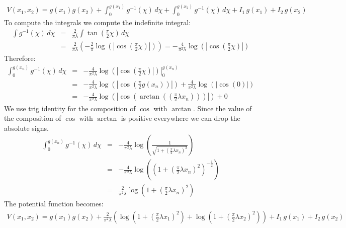 \begin{eqnarray*}
V(x_1, x_2) = g(x_1) g(x_2) + \int_0^{g(x_1)} g^{-1}(\chi) \, d\chi 
                            + \int_0^{g(x_2)} g^{-1}(\chi) \, d\chi
             + I_1 \, g(x_1) + I_2 \, g(x_2) 
\end{eqnarray*}
To compute the integrals we compute the indefinite integral:
\begin{eqnarray*}
\int g^{-1}(\chi) \, d\chi  &=& \frac{2}{\pi\lambda} 
                        \int \tan\left( \frac{\pi}{2} \chi \right) \, d\chi \\
~ &=& \frac{2}{\pi\lambda} 
\left( -\frac{2}{\pi} \log\left( \left|\cos\left(\frac{\pi}{2}\chi \right)\right|\right)\right)
= -\frac{4}{\pi^2\lambda} 
\log\left( \left|\cos\left(\frac{\pi}{2}\chi \right)\right|\right)
\end{eqnarray*}
Therefore:
\begin{eqnarray*}
\int_0^{g(x_n)} g^{-1}(\chi) \, d\chi  &=& 
 -\frac{4}{\pi^2\lambda} \left.  \log\left( \left|\cos\left(\frac{\pi}{2}\chi 
\right)\right|\right)\right|_0^{g(x_n)} \\
~ &=& 
 -\frac{4}{\pi^2\lambda}  \log\left( \left|\cos\left(\frac{\pi}{2} g(x_n)
\right)\right|\right)
 +\frac{4}{\pi^2\lambda}  \log\left( \left|\cos(0) \right|\right) \\
~ &=& 
 -\frac{4}{\pi^2\lambda}  \log\left( \left|\cos\left(\arctan\left(
                        \left( \frac{\pi}{2} \lambda x_n \right)\right)\right)\right|\right) + 0
\end{eqnarray*}
We use trig identity for the composition of $\cos$ with $\arctan$.
Since the value of the composition of $\cos$ with $\arctan$ is positive 
everywhere we can drop the absolute signs.
\begin{eqnarray*}
\int_0^{g(x_n)} g^{-1}(\chi) \, d\chi  &=& -\frac{4}{\pi^2\lambda}  \log\left( 
\frac{1}{\sqrt{1 
+ \left(\displaystyle{\frac{\pi}{2}}\lambda x_n\right)^2}} \right) \\
~ &=& -\frac{4}{\pi^2\lambda}  \log\left( \left(1 
+ \left(\displaystyle{\frac{\pi}{2}}\lambda x_n\right)^2\right)^{-\displaystyle{\frac{1}{2}}} \right) \\
~ &=& \frac{2}{\pi^2\lambda}  \log\left( 1 
+ \left(\displaystyle{\frac{\pi}{2}}\lambda x_n\right)^2 \right)
\end{eqnarray*}
The potential function becomes:
\begin{eqnarray*}
V(x_1, x_2) = g(x_1) g(x_2) + 
\frac{2}{\pi^2\lambda} \left(
  \log\left( 1 + \left(\displaystyle{\frac{\pi}{2}}\lambda x_1\right)^2 \right)
+ \log\left( 1 + \left(\displaystyle{\frac{\pi}{2}}\lambda x_2\right)^2 \right)
\right) + I_1 \, g(x_1) + I_2 \, g(x_2) 
\end{eqnarray*}
